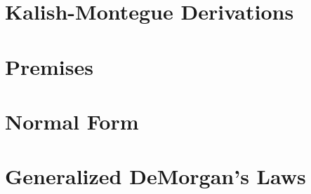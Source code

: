 \documentclass[a4paper,12pt]{article}
\begin{document}
\section{Kalish-Montegue Derivations}

\section{Premises}

\section{Normal Form}

\section{Generalized DeMorgan's Laws}
\end{document}
